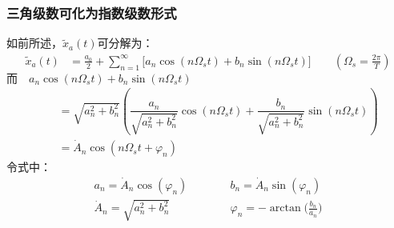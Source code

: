 \documentclass[notheorems,compress,mathserif,table]{beamer}
\begin{document}
\begin{frame}[shrink]\frametitle{三角级数可化为指数级数形式}%
如前所述，$ \tilde{x}_a(t)  $可分解为：
\begin{equation*}
\begin{split}
	\tilde{x}_a(t) &= \frac{a_0}{2}+\sum_{n=1}^{\infty}\Big[a_n \cos(n \Omega_s t)+ b_n \sin(n \Omega_s t)\Big]\quad\quad    %
                                         \left(\Omega_s = \frac{2\pi}{T}\right)
\end{split}
\end{equation*}
$$\mbox{而} \quad a_n \cos(n \Omega_s t)+ b_n \sin(n\Omega_s t)\qquad\qquad\qquad\qquad\qquad\qquad\qquad\qquad\qquad\qquad$$
\begin{equation*}
\begin{split}
\quad             &= \sqrt{a^2_n +b^2_n}\left (\dfrac{a_n}{\sqrt{a^2_n +b^2_n}}\cos(n \Omega_s t)+ \dfrac{b_n}{\sqrt{a^2_n +b^2_n}} \sin(n\Omega_s t)\right )\\
\quad             &=  \dot{A}_n \cos(n \Omega_s t +\varphi_n)
\end{split}
\end{equation*}
令式中：
\begin{equation*}
\begin{split}
       a_n= \dot{A}_n \cos(\varphi_n)\qquad        &\quad    b_n = \dot{A}_n \sin(\varphi_n) \\
       \dot{A}_n = \sqrt{a^2_n +b^2_n}\qquad      &\quad    \varphi_n = - \arctan\Big(\frac{b_n}{a_n}\Big)
 \end{split}
\end{equation*}
\end{frame}
%
%
%
\end{document}

